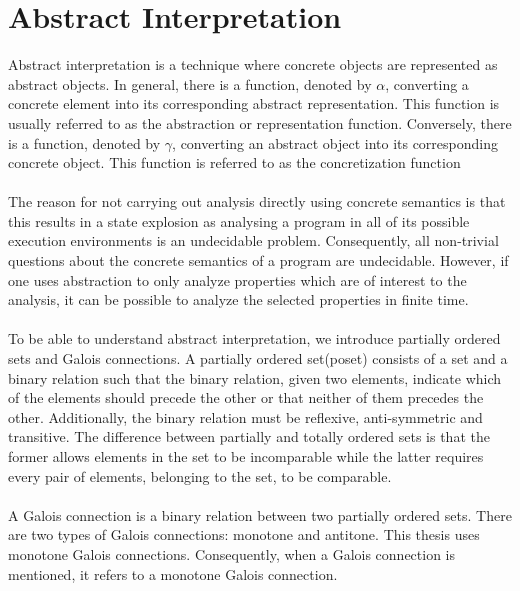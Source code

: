 \documentclass{kththesis}
\newcommand{\fbcomment}[1]{{#1}}
\renewcommand{\fbcomment}[1]{}
\begin{document}
\section{Abstract Interpretation}\label{sec:AbsInt}
\fbcomment{\color{red}Goal: Give the reader a basic understanding of abstract interpretation.}
Abstract interpretation is a technique where concrete objects are represented as abstract objects. In general, there is a function, denoted by $\alpha$, converting a concrete element into its corresponding abstract representation. This function is usually referred to as the abstraction or representation function. Conversely, there is a function, denoted by $\gamma$, converting an abstract object into its corresponding concrete object. This function is referred to as the concretization function
\\ \\%
The reason for not carrying out analysis directly using concrete semantics is that this results in a state explosion as analysing a program in all of its possible execution environments is an undecidable problem\parencite{FRPatrick}. Consequently, all non-trivial questions about the concrete semantics of a program are undecidable. However, if one uses abstraction to only analyze properties which are of interest to the analysis, it can be possible to analyze the selected properties in finite time.
\\ \\
To be able to understand abstract interpretation, we introduce partially ordered sets\parencite{EoMPoset} and Galois connections\cite{galoisConnections}. A partially ordered set(poset) consists of a set and a binary relation such that the binary relation, given two elements, indicate which of the elements should precede the other or that neither of them precedes the other. Additionally, the binary relation must be reflexive, anti-symmetric and transitive. The difference between partially and totally ordered sets is that the former allows elements in the set to be incomparable while the latter requires every pair of elements, belonging to the set, to be comparable.
\\ \\
A Galois connection is a binary relation between two partially ordered sets. There are two types of Galois connections: monotone and antitone. This thesis uses monotone Galois connections. Consequently, when a Galois connection is mentioned, it refers to a monotone Galois connection.
\end{document}
